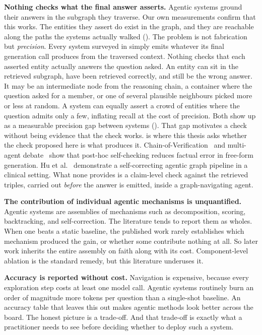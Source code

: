 \textbf{Nothing checks what the final answer asserts.} Agentic systems ground
their answers in the subgraph they traverse. Our own measurements confirm that
this works. The entities they assert do exist in the graph, and they are
reachable along the paths the systems actually walked
(). The problem is not fabrication but
\emph{precision}. Every system surveyed in  simply emits
whatever its final generation call produces from the traversed context. Nothing
checks that each asserted entity actually answers the question asked. An entity
can sit in the retrieved subgraph, have been retrieved correctly, and still be
the wrong answer. It may be an intermediate node from the reasoning chain, a
container where the question asked for a member, or one of several plausible
neighbours picked more or less at random. A system can equally assert a crowd of
entities where the question admits only a few, inflating recall at the cost of
precision. Both show up as a measurable precision gap between systems
(). That gap motivates a check without being evidence
that the check works.  is where this thesis asks whether the
check proposed here is what produces it.
Chain-of-Verification~\cite{dhuliawala2024chain} and multi-agent
debate~\cite{du2024improving} show that post-hoc self-checking reduces factual
error in free-form generation. Hu et al.~\cite{hu2025selfcorrecting} demonstrate
a self-correcting agentic graph pipeline in a clinical setting. What none
provides is a claim-level check against the retrieved triples, carried out
\emph{before} the answer is emitted, inside a graph-navigating agent.

\textbf{The contribution of individual agentic mechanisms is unquantified.}
Agentic systems are assemblies of mechanisms such as decomposition, scoring,
backtracking, and self-correction. The literature tends to report them as
wholes. When one beats a static baseline, the published work rarely establishes
which mechanism produced the gain, or whether some contribute nothing at all. So
later work inherits the entire assembly on faith along with its cost.
Component-level ablation is the standard remedy, but this literature underuses
it.

\textbf{Accuracy is reported without cost.} Navigation is expensive, because
every exploration step costs at least one model call. Agentic systems routinely
burn an order of magnitude more tokens per question than a single-shot baseline.
An accuracy table that leaves this out makes agentic methods look better across
the board. The honest picture is a trade-off. And that trade-off is exactly what
a practitioner needs to see before deciding whether to deploy such a system.

